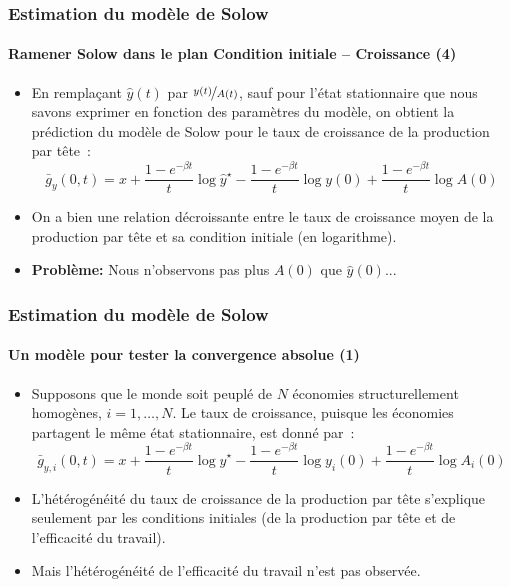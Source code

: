 \documentclass[10pt,notheorems]{beamer}
\theoremstyle{plain}
\theoremstyle{definition} %
\begin{document}
\begin{frame}
  \frametitle{Estimation du modèle de Solow}
  \framesubtitle{Ramener Solow dans le plan Condition initiale -- Croissance (4)}

  \begin{itemize}

  \item En remplaçant $\hat y(t)$ par $\nicefrac{y(t)}{A(t)}$, sauf pour l'état stationnaire que nous savons exprimer en fonction des paramètres du modèle, on obtient la prédiction du modèle de Solow pour le taux de croissance de la production par tête~:
    \[
      \bar g_{y}(0,t) = x + \frac{1-e^{-\beta t}}{t}\log \hat y^{\star} - \frac{1-e^{-\beta t}}{t}\log y(0) + \frac{1-e^{-\beta t}}{t}\log A(0)
    \]

    \bigskip

  \item On a bien une relation décroissante entre le taux de croissance moyen de la production par tête et sa condition initiale (en logarithme).\newline

  \item \textbf{Problème:} Nous n'observons pas plus $A(0)$ que $\hat y(0)$...

  \end{itemize}

\end{frame}


\begin{frame}
  \frametitle{Estimation du modèle de Solow}
  \framesubtitle{Un modèle pour tester la convergence absolue (1)}

  \begin{itemize}

  \item Supposons que le monde soit peuplé de $N$ économies structurellement homogènes, $i=1,\ldots,N$. Le taux de croissance, puisque les économies partagent le même état stationnaire, est donné par~:
    \[
      \bar g_{y,i}(0,t) = x + \frac{1-e^{-\beta t}}{t}\log \hat y^{\star} - \frac{1-e^{-\beta t}}{t}\log y_i(0) + \frac{1-e^{-\beta t}}{t}\log A_i(0)
    \]

    \bigskip

  \item L'hétérogénéité du taux de croissance de la production par tête s'explique seulement par les conditions initiales (de la production par tête et de l'efficacité du travail).\newline

  \item Mais l'hétérogénéité de l'efficacité du travail n'est pas observée.

  \end{itemize}

\end{frame}
\end{document}
